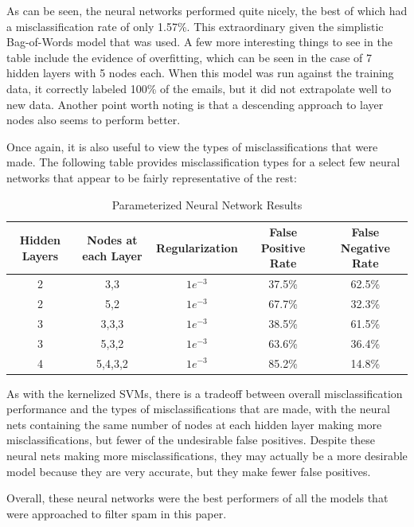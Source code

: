 \documentclass{article}
\begin{document}
As can be seen, the neural networks performed quite nicely, the best of which had a misclassification rate of only 1.57\%. This extraordinary given the simplistic Bag-of-Words model that was used. A few more interesting things to see in the table include the evidence of overfitting, which can be seen in the case of 7 hidden layers with 5 nodes each. When this model was run against the training data, it correctly labeled 100\% of the emails, but it did not extrapolate well to new data. Another point worth noting is that a descending approach to layer nodes also seems to perform better. 

Once again, it is also useful to view the types of misclassifications that were made. The following table provides misclassification types for a select few neural networks that appear to be fairly representative of the rest:
\newpage
\begin{table}[h!]
\begin{center}
\caption{Parameterized Neural Network Results}
\hspace*{-1cm}\begin{tabular}{c|c|c|c|c}
 \textbf{Hidden Layers} & \textbf{Nodes at each Layer} & \textbf{Regularization} & \textbf{False Positive Rate} & \textbf{False Negative Rate}\\
\hline
 2 &3,3 &$1e^{-3}$ & 37.5\% & 62.5\%\\
 2 &5,2 &$1e^{-3}$ & 67.7\% & 32.3\%\\
 3 &3,3,3 &$1e^{-3}$ & 38.5\% & 61.5\%\\
 3 &5,3,2&$1e^{-3}$ & 63.6\% & 36.4\%\\
 4 &5,4,3,2 &$1e^{-3}$ & 85.2\% & 14.8\%\\
\end{tabular}
\end{center}
\end{table}

As with the kernelized SVMs, there is a tradeoff between overall misclassification performance and the types of misclassifications that are made, with the neural nets containing the same number of nodes at each hidden layer making more misclassifications, but fewer of the undesirable false positives. Despite these neural nets making more misclassifications, they may actually be a more desirable model because they are very accurate, but they make fewer false positives.

Overall, these neural networks were the best performers of all the models that were approached to filter spam in this paper.
\end{document}
